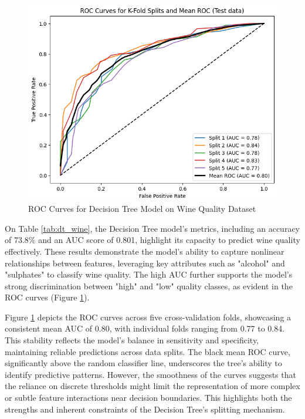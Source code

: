 \documentclass[conference]{IEEEtran}
\begin{document}
  \begin{figure}[h]
    \centering
    \includegraphics[width=\columnwidth]{plots/dt_wine_ROC_curves.png}
    \caption{ROC Curves for Decision Tree Model on Wine Quality Dataset}
    \label{fig:dt_roc_wine}
  \end{figure}


On Table \ref{tab:dt_wine}, the Decision Tree model's metrics, including an accuracy of 73.8\% and an AUC score of 0.801, highlight its capacity to predict wine quality effectively. These results demonstrate the model's ability to capture nonlinear relationships between features, leveraging key attributes such as "alcohol" and "sulphates" to classify wine quality. The high AUC further supports the model’s strong discrimination between "high" and "low" quality classes, as evident in the ROC curves (Figure \ref{fig:dt_roc_wine}).

Figure \ref{fig:dt_roc_wine} depicts the ROC curves across five cross-validation folds, showcasing a consistent mean AUC of 0.80, with individual folds ranging from 0.77 to 0.84. This stability reflects the model's balance in sensitivity and specificity, maintaining reliable predictions across data splits. The black mean ROC curve, significantly above the random classifier line, underscores the tree's ability to identify predictive patterns. However, the smoothness of the curves suggests that the reliance on discrete thresholds might limit the representation of more complex or subtle feature interactions near decision boundaries. This highlights both the strengths and inherent constraints of the Decision Tree's splitting mechanism.
\end{document}
